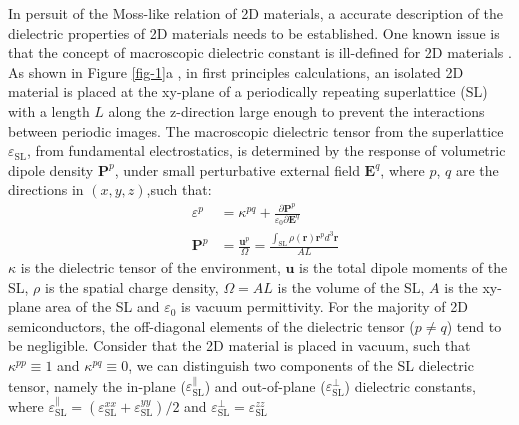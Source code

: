 \documentclass[journal=ancac3,manuscript=article,email=true,hyperref=true,keywords=false]{achemso}
\begin{document}
In persuit of the Moss-like relation of 2D materials, a accurate
description of the dielectric properties of 2D materials needs to be
established. One known issue is that the concept of macroscopic
dielectric constant is ill-defined for 2D materials
\cite{Cudazzo_2010_screen2D,Cudazzo_2011_screening_2D,Nazarov_2015_2D_3D}. As
shown in Figure \ref{fig-1}a , in first principles calculations, an isolated 2D material is
placed at the xy-plane of a periodically repeating superlattice (SL)
with a length $L$ along the z-direction large enough to prevent the
interactions between periodic images. The macroscopic dielectric
tensor from the superlattice $\varepsilon_{\mathrm{SL}}$, from
fundamental electrostatics, is determined by the response of
volumetric dipole density $\boldsymbol{P}^{p}$, under small perturbative
external field $\boldsymbol{E}^{q}$, where $p$, $q$ are the
directions in $(x, y, z)$,such that:
\begin{subequations}
  \begin{eqnarray}
      \label{eq:def-eps-1}
    &\varepsilon^{p} &= \kappa^{pq} +
                                 {\displaystyle \frac{\partial \boldsymbol{P}^{p}}
                                 {\varepsilon_{0} \partial \boldsymbol{E}^{q}}} \\
          \label{eq:def-eps-2}
    &\boldsymbol{P}^{p} &=  {\displaystyle \frac{\boldsymbol{u}^{p}}{\Omega}}
                          = {\displaystyle \frac{{\displaystyle
          \int_{\mathrm{SL}} \rho(\boldsymbol{r}) \boldsymbol{r}^{p} d^{3}\boldsymbol{r}}}
                          {AL}}
  \end{eqnarray}
\end{subequations}
$\kappa$ is the dielectric tensor of the environment, $\boldsymbol{u}$
is the total dipole moments of the SL, $\rho$ is the spatial charge
density, $\Omega=AL$ is the volume of the SL, $A$ is the xy-plane area
of the SL and $\varepsilon_{0}$ is vacuum permittivity. For the
majority of 2D semiconductors, the off-diagonal elements of the
dielectric tensor ($p \neq q$) tend to be negligible.  Consider that
the 2D material is placed in vacuum, such that $\kappa^{pp} \equiv 1$
and $\kappa^{pq} \equiv 0$, we can distinguish two components of the
SL dielectric tensor, namely the in-plane
($\varepsilon_{\mathrm{SL}}^{\parallel}$) and out-of-plane
($\varepsilon_{\mathrm{SL}}^{\perp}$) dielectric constants, where
$\varepsilon_{\mathrm{SL}}^{\parallel} =
(\varepsilon_{\mathrm{SL}}^{xx} + \varepsilon_{\mathrm{SL}}^{yy})/2$
and
$\varepsilon_{\mathrm{SL}}^{\perp} = \varepsilon_{\mathrm{SL}}^{zz}$
\end{document}
